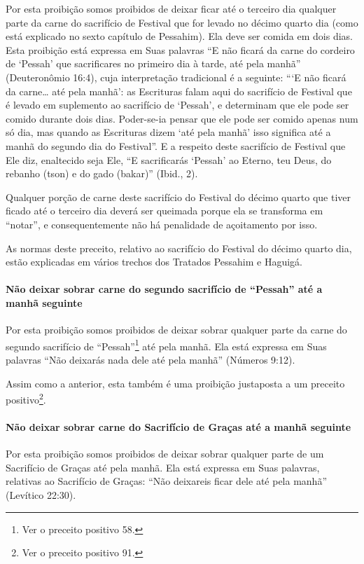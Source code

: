 Por esta proibição somos proibidos de deixar ficar até o terceiro dia
qualquer parte da carne do sacrifício de Festival que for levado no
décimo quarto dia (como está explicado no sexto capítulo de Pessahim).
Ela deve ser comida em dois dias. Esta proibição está expressa em Suas
palavras ``E não ficará da carne do cordeiro de `Pessah' que
sacrificares no primeiro dia à tarde, até pela manhã'' (Deuteronômio
16:4), cuja interpretação tradicional é a seguinte: ```E não ficará da
carne\ldots{} até pela manhã': as Escrituras falam aqui do sacrifício de
Festival que é levado em suplemento ao sacrifício de `Pessah', e
determinam que ele pode ser comido durante dois dias. Poder-se-ia pensar
que ele pode ser
comido apenas num só dia, mas quando as Escrituras dizem `até pela
manhã' isso significa até a manhã do segundo dia do Festival''. E a
respeito deste sacrifício de Festival que Ele diz, enaltecido seja Ele,
``E sacrificarás `Pessah' ao Eterno, teu Deus, do rebanho (tson) e do
gado (bakar)'' (Ibid., 2).

Qualquer porção de carne deste sacrifício do Festival do décimo quarto
que tiver ficado até o terceiro dia deverá ser queimada porque ela se
transforma em ``notar'', e consequentemente não há penalidade de
açoitamento por isso.

As normas deste preceito, relativo ao sacrifício do Festival do décimo
quarto dia, estão explicadas em vários trechos dos Tratados Pessahim e
Haguigá.

\paragraph{Não deixar sobrar carne do segundo sacrifício de
``Pessah'' até a manhã seguinte}

Por esta proibição somos proibidos de deixar sobrar qualquer parte da
carne do segundo sacrifício de ``Pessah''\footnote{Ver o preceito positivo 58.} até pela
manhã. Ela está expressa em Suas palavras ``Não deixarás nada dele até
pela manhã'' (Números 9:12).

Assim como a anterior, esta também é uma proibição justaposta a um
preceito positivo\footnote{Ver o preceito positivo 91.}.

\paragraph{Não deixar sobrar carne do Sacrifício de Graças até a manhã seguinte}

Por esta proibição somos proibidos de deixar sobrar qualquer parte de um
Sacrifício de Graças até pela manhã. Ela está expressa em Suas palavras,
relativas ao Sacrifício de Graças: ``Não deixareis ficar dele até pela
manhã'' (Levítico 22:30).

